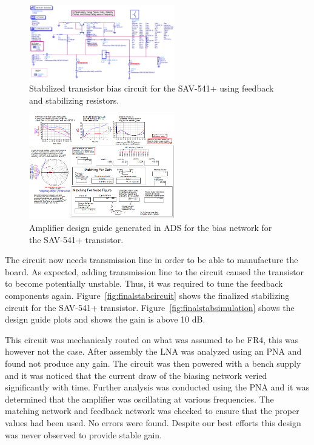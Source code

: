 \documentclass[conference]{IEEEtran}
\begin{document}
\begin{figure}[!h]
\centering
\includegraphics[width=2.5in]{pics/DesignGuideStablizedCircuit.png}
\caption{Stabilized transistor bias circuit for the SAV-541+ using feedback and stabilizing resistors.}
\label{fig:designcuidecircuitstabilized}
\end{figure}

\begin{figure}[!h]
\centering
\includegraphics[width=2.5in]{pics/DesignGuideStablizedSimulation.png}
\caption{Amplifier design guide generated in ADS for the bias network for the SAV-541+ transistor.}
\label{fig:designcuidesimulationstabilized}
\end{figure}

The circuit now needs transmission line in order to be able to manufacture the board.  As expected, adding transmission line to the circuit caused the transistor to become potentially unstable.  Thus, it was required to tune the feedback components again.  Figure~\ref{fig:finalstabcircuit} shows the finalized stabilizing circuit for the SAV-541+ transistor.  Figure~\ref{fig:finalstabsimulation} shows the design guide plots and shows the gain is above 10 dB.

This circuit was mechanicaly routed on what was assumed to be FR4, this was however not the case. After assembly the LNA was analyzed using an PNA and found not produce any gain. The circuit was then powered with a bench supply and it was noticed that the current draw of the biasing network veried significantly with time. Further analysis was conducted using the PNA and it was determined that the amplifier was oscillating at various frequencies. The matching network and feedback network was checked to ensure that the proper values had been used. No errors were found. Despite our best efforts this design was never observed to provide stable gain.
\end{document}
